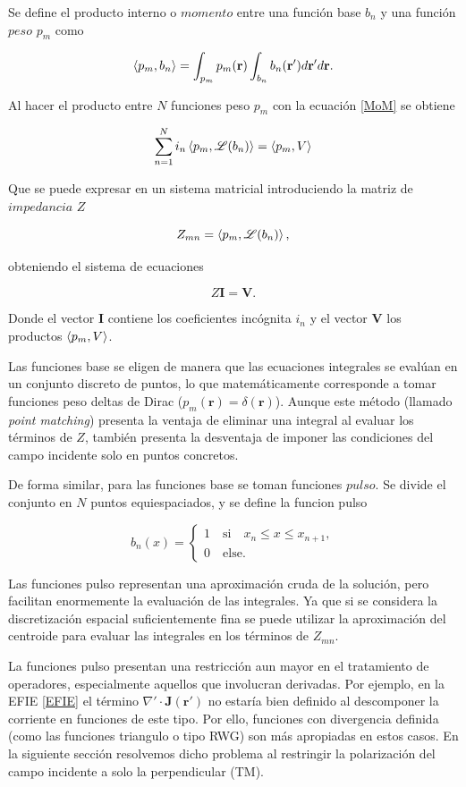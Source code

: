 \documentclass[11pt,a4paper,twoside,pdf]{article}
\numberwithin{equation}{section}
\begin{document}
Se define el producto interno o $momento$ entre una función base $b_n$ y una función $peso$ $p_m$ como

$$
   \braket{p_m, b_n} = \int_{p_m} p_m({\mathbf{r}}) \int_{b_n} b_n({\mathbf{r'}}) d\mathbf{r'} d\mathbf{r}.
$$

Al hacer el producto entre $N$ funciones peso $p_m$ con la ecuación \ref{MoM} se obtiene

$$
    \sum_{n=1}^N i_n \braket{p_m, \mathscr{L}(b_n)} = \braket{p_m, V}
$$

Que se puede expresar en un sistema matricial introduciendo la matriz de $impedancia$ $Z$

$$
    Z_{mn} = \braket{p_m, \mathscr{L}(b_n)},
$$

obteniendo el sistema de ecuaciones

\begin{equation}
    Z \mathbf{I} = \mathbf{V}.
\label{ZIV}
\end{equation}

Donde el vector $\mathbf{I}$ contiene los coeficientes incógnita $i_n$ y el vector $\mathbf{V}$ los productos $\braket{p_m, V}$.

Las funciones base se eligen de manera que las ecuaciones integrales se evalúan en un conjunto discreto de puntos, lo que matemáticamente corresponde a tomar funciones peso deltas de Dirac ($p_m(\mathbf{r}) = \delta(\mathbf{r})$). Aunque este método (llamado \textit{point matching}) presenta la ventaja de eliminar una integral al evaluar los términos de $Z$, también presenta la desventaja de imponer las condiciones del campo incidente solo en puntos concretos. 


De forma similar, para las funciones base se toman funciones $pulso$. Se divide el conjunto en $N$ puntos equiespaciados, y se define la funcion pulso

$$
    b_n(x) = 
    \begin{cases}
        1 \quad \text{si}  \quad x_n \leq x \leq x_{n+1}, \\
        0  \quad  \text{else}.
    \end{cases}
$$

Las funciones pulso representan una aproximación cruda de la solución, pero facilitan enormemente la evaluación de las integrales. Ya que si se considera la discretización espacial suficientemente fina se puede utilizar la aproximación del centroide para evaluar las integrales en los términos de $Z_{mn}$.

La funciones pulso presentan una restricción aun mayor en el tratamiento de operadores, especialmente aquellos que involucran derivadas. Por ejemplo, en la EFIE \ref{EFIE} el término $\nabla' \cdot \mathbf{J(\mathbf{r'})}$ no estaría bien definido al descomponer la corriente en funciones de este tipo. Por ello, funciones con divergencia definida (como las funciones triangulo o tipo RWG) son más apropiadas en estos casos.
En la siguiente sección resolvemos dicho problema al restringir la polarización del campo incidente a solo la perpendicular (TM).
\end{document}
